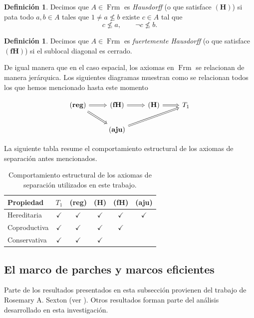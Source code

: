 \documentclass[11pt]{amsart}
\DeclareMathOperator{\Frm}{Frm}
\theoremstyle{plain}
\theoremstyle{definition}
\newtheorem{dfn}[thm]{Definición}
\begin{document}
\begin{dfn}\label{H}
Decimos que $A\in \Frm$ es \emph{Hausdorff} (o que satisface $\mathbf{(H)}$) si pata todo $a, b\in A$ tales que $1\neq a\nleq b$ existe $c\in A$ tal que
\[
c\nleq a, \qquad \neg c\nleq b.
\]
\end{dfn}

\begin{dfn}\label{fH}
Decimos que $A\in \Frm$ es \emph{fuertemente Hausdorff} (o que satisface $\mathbf{(fH)}$) si el sublocal diagonal es cerrado.
\end{dfn}

De igual manera que en el caso espacial, los axiomas en $\Frm$ se relacionan de manera jerárquica. Los siguientes diagramas muestran
como se relacionan todos los que hemos mencionado hasta este momento

\[\begin{tikzcd}
	{\mathbf{(reg)}} & {\mathbf{(fH)}} & {\mathbf{(H)}} & {T_1} \\
	& {\mathbf{(aju)}}
	\arrow[Rightarrow, from=1-1, to=1-2]
	\arrow[Rightarrow, from=1-1, to=2-2]
	\arrow[Rightarrow, from=1-2, to=1-3]
	\arrow[Rightarrow, from=1-3, to=1-4]
	\arrow[Rightarrow, from=2-2, to=1-4]
\end{tikzcd}\]

La siguiente tabla resume el comportamiento estructural de los axiomas de separación antes mencionados.
\begin{table}[htbp]
\centering
\begin{tabular}{lccccc}
\toprule
Propiedad & $T_1$ & (reg) & (H) & (fH) & (aju) \\
\midrule
Hereditaria & $\checkmark$ & $\checkmark$ & $\checkmark$ & $\checkmark$ & $\checkmark$ \\
Coproductiva & $\checkmark$ & $\checkmark$ & $\checkmark$ & $\checkmark$ &  \\
Conservativa & $\checkmark$ & $\checkmark$ & $\checkmark$ &  &  \\
\bottomrule
\end{tabular}
\caption{Comportamiento estructural de los axiomas de separación utilizados en este trabajo.}
\end{table}

\subsection{El marco de parches y marcos eficientes}
Parte de los resultados presentados en esta subsección provienen del trabajo de Rosemary A. Sexton (ver \cite{sexton2003point,sexton2006ordinal,sexton2006point}). 
Otros resultados forman parte del análisis desarrollado en esta investigación.\\
\end{document}
